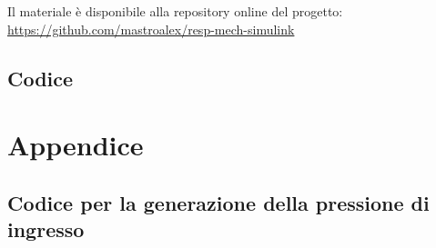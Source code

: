 Il materiale è disponibile alla repository online del progetto: \url{https://github.com/mastroalex/resp-mech-simulink}

\subsection*{Codice}

\raggedbottom

\pagebreak
\printbibliography[title=Riferimenti]


\clearpage
\section*{Appendice}

\subsection*{Codice per la generazione della pressione di ingresso}
